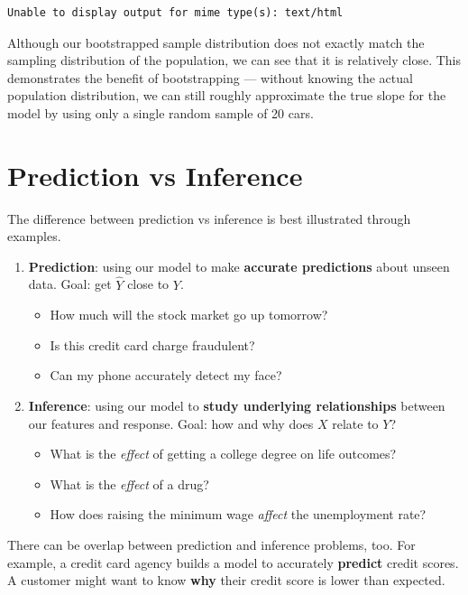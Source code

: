 \documentclass[
  letterpaper,
  DIV=11,
  numbers=noendperiod]{scrreprt}
\providecommand{\tightlist}{%
  \setlength{\itemsep}{0pt}\setlength{\parskip}{0pt}}\usepackage{longtable,booktabs,array}
\begin{document}
\begin{verbatim}
Unable to display output for mime type(s): text/html
\end{verbatim}

Although our bootstrapped sample distribution does not exactly match the
sampling distribution of the population, we can see that it is
relatively close. This demonstrates the benefit of bootstrapping ---
without knowing the actual population distribution, we can still roughly
approximate the true slope for the model by using only a single random
sample of 20 cars.

\section{Prediction vs Inference}\label{prediction-vs-inference}

The difference between prediction vs inference is best illustrated
through examples.

\begin{enumerate}
\def\labelenumi{\arabic{enumi}.}
\tightlist
\item
  \textbf{Prediction}: using our model to make \textbf{accurate
  predictions} about unseen data. Goal: get \(\hat{Y}\) close to \(Y\).

  \begin{itemize}
  \tightlist
  \item
    How much will the stock market go up tomorrow?
  \item
    Is this credit card charge fraudulent?
  \item
    Can my phone accurately detect my face?
  \end{itemize}
\item
  \textbf{Inference}: using our model to \textbf{study underlying
  relationships} between our features and response. Goal: how and why
  does \(X\) relate to \(Y\)?

  \begin{itemize}
  \tightlist
  \item
    What is the \emph{effect} of getting a college degree on life
    outcomes?
  \item
    What is the \emph{effect} of a drug?
  \item
    How does raising the minimum wage \emph{affect} the unemployment
    rate?
  \end{itemize}
\end{enumerate}

There can be overlap between prediction and inference problems, too. For
example, a credit card agency builds a model to accurately
\textbf{predict} credit scores. A customer might want to know
\textbf{why} their credit score is lower than expected.
\end{document}
